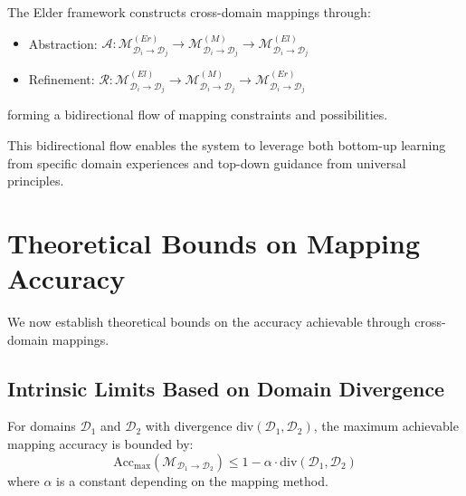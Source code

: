 \begin{definition}
The Elder framework constructs cross-domain mappings through:
\begin{itemize}
    \item Abstraction: $\mathcal{A}: \mathcal{M}^{(Er)}_{\mathcal{D}_i \rightarrow \mathcal{D}_j} \rightarrow \mathcal{M}^{(M)}_{\mathcal{D}_i \rightarrow \mathcal{D}_j} \rightarrow \mathcal{M}^{(El)}_{\mathcal{D}_i \rightarrow \mathcal{D}_j}$
    \item Refinement: $\mathcal{R}: \mathcal{M}^{(El)}_{\mathcal{D}_i \rightarrow \mathcal{D}_j} \rightarrow \mathcal{M}^{(M)}_{\mathcal{D}_i \rightarrow \mathcal{D}_j} \rightarrow \mathcal{M}^{(Er)}_{\mathcal{D}_i \rightarrow \mathcal{D}_j}$
\end{itemize}
forming a bidirectional flow of mapping constraints and possibilities.
\end{definition}

This bidirectional flow enables the system to leverage both bottom-up learning from specific domain experiences and top-down guidance from universal principles.

\section{Theoretical Bounds on Mapping Accuracy}

We now establish theoretical bounds on the accuracy achievable through cross-domain mappings.

\subsection{Intrinsic Limits Based on Domain Divergence}

\begin{theorem}
For domains $\mathcal{D}_1$ and $\mathcal{D}_2$ with divergence $\text{div}(\mathcal{D}_1, \mathcal{D}_2)$, the maximum achievable mapping accuracy is bounded by:
\begin{equation}
\text{Acc}_{\max}(\mathcal{M}_{\mathcal{D}_1 \rightarrow \mathcal{D}_2}) \leq 1 - \alpha \cdot \text{div}(\mathcal{D}_1, \mathcal{D}_2)
\end{equation}
where $\alpha$ is a constant depending on the mapping method.
\end{theorem}

